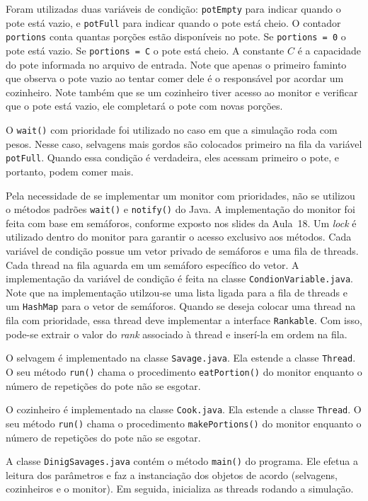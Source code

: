 \documentclass[11pt,a4paper]{article}
\begin{document}
Foram utilizadas duas variáveis de condição: \verb|potEmpty| para indicar quando o pote está vazio, 
e \verb|potFull| para indicar quando o pote está cheio. O contador \verb|portions| conta quantas 
porções estão disponíveis no pote. Se \verb|portions = 0| o pote está vazio. Se 
\verb|portions = C| o pote está cheio. A constante $C$ é a capacidade do pote informada no arquivo 
de entrada. Note que apenas o primeiro faminto que observa o pote vazio ao tentar comer dele é o 
responsável por acordar um cozinheiro. Note também que se um cozinheiro tiver acesso ao monitor e 
verificar que o pote está vazio, ele completará o pote com novas porções. 

O \verb|wait()| com prioridade foi utilizado no caso em que a simulação roda com pesos. Nesse caso, 
selvagens mais gordos são colocados primeiro na fila da variável \verb|potFull|. Quando essa 
condição é verdadeira, eles acessam primeiro o pote, e portanto, podem comer mais.

Pela necessidade de se implementar um monitor com prioridades, não se utilizou o métodos padrões
\verb|wait()| e \verb|notify()| do Java. A implementação do monitor foi feita com base em semáforos,
conforme exposto nos slides da Aula~18. Um {\it lock} é utilizado dentro do  monitor para garantir o
acesso exclusivo aos métodos. Cada variável de condição possue um vetor  privado de semáforos e uma
fila de threads. Cada thread na fila aguarda em um semáforo específico do  vetor. A implementação da
variável de condição é feita na classe \verb|CondionVariable.java|. Note  que na implementação
utilzou-se uma lista ligada para a fila de threads e um \verb|HashMap| para o vetor de semáforos.
Quando se deseja colocar uma thread na fila com prioridade, essa thread deve  implementar a
interface \verb|Rankable|. Com isso, pode-se extrair o valor do {\it rank} associado à thread e
inserí-la em ordem na fila.

O selvagem é implementado na classe \verb|Savage.java|. Ela estende a classe \verb|Thread|. O seu 
método \verb|run()| chama o procedimento \verb|eatPortion()| do monitor enquanto o número de 
repetições do pote não se esgotar.

O cozinheiro é implementado na classe \verb|Cook.java|. Ela estende a classe \verb|Thread|. O seu 
método \verb|run()| chama o procedimento \verb|makePortions()| do monitor enquanto o número de 
repetições do pote não se esgotar.

A classe \verb|DinigSavages.java| contém o método \verb|main()| do programa. Ele efetua a leitura
dos parâmetros e faz a instanciação dos objetos de acordo (selvagens, cozinheiros e o monitor). 
Em seguida, inicializa as threads rodando a simulação.
\end{document}
